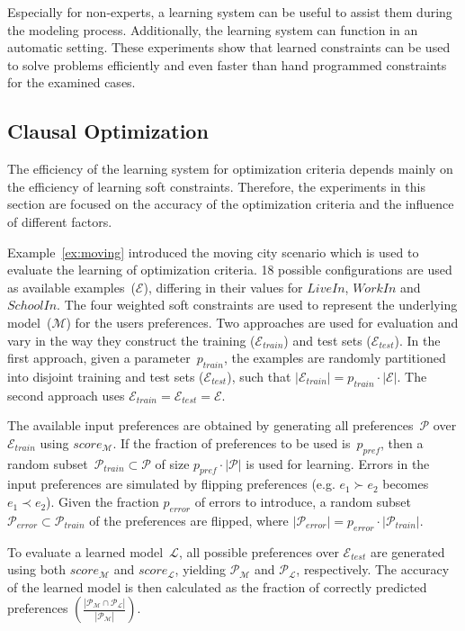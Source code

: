 \documentclass[letterpaper]{article}
\newcommand{\sym}[1]{\ensuremath{\mathcal{#1}}}
\theoremstyle{definition}
\newcommand{\abs}[1]{\left|#1\right|}
\begin{document}
Especially for non-experts, a learning system can be useful to assist them during the modeling process.
Additionally, the learning system can function in an automatic setting.
These experiments show that learned constraints can be used to solve problems efficiently and even faster than hand programmed constraints for the examined cases.

\subsection{Clausal Optimization}
The efficiency of the learning system for optimization criteria depends mainly on the efficiency of learning soft constraints.
Therefore, the experiments in this section are focused on the accuracy of the optimization criteria and the influence of different factors.

Example~\ref{ex:moving} introduced the moving city scenario which is used to evaluate the learning of optimization criteria.
18 possible configurations are used as available examples~(\sym{E}), differing in their values for $\mathit{LiveIn}$, $\mathit{WorkIn}$ and $\mathit{SchoolIn}$.
The four weighted soft constraints are used to represent the underlying model~(\sym{M}) for the users preferences.
Two approaches are used for evaluation and vary in the way they construct the training ($\sym{E}_{train}$) and test sets ($\sym{E}_{test}$).
In the first approach, given a parameter~$p_{train}$, the examples are randomly partitioned into disjoint training and test sets ($\sym{E}_{test}$), such that $\abs{\sym{E}_{train}} = p_{train} \cdot \abs{\sym{E}}$.
The second approach uses $\sym{E}_{train} = \sym{E}_{test} = \sym{E}$.

The available input preferences are obtained by generating all preferences~$\sym{P}$ over $\sym{E}_{train}$ using $score_{\sym{M}}$.
If the fraction of preferences to be used is~$p_{pref}$, then a random subset~$\sym{P}_{train} \subset \sym{P}$ of size $p_{pref} \cdot \abs{\sym{P}}$ is used for learning.
Errors in the input preferences are simulated by flipping preferences (e.g. $e_1 \succ e_2$ becomes $e_1 \prec e_2$).
Given the fraction $p_{error}$ of errors to introduce, a random subset $\sym{P}_{error} \subset \sym{P}_{train}$ of the preferences are flipped, where $\abs{\sym{P}_{error}} = p_{error} \cdot \abs{\sym{P}_{train}}$.

To evaluate a learned model~$\sym{L}$, all possible preferences over $\sym{E}_{test}$ are generated using both $score_{\sym{M}}$ and $score_{\sym{L}}$, yielding $\sym{P}_\sym{M}$ and $\sym{P}_\sym{L}$, respectively.
The accuracy of the learned model is then calculated as the fraction of correctly predicted preferences $(\frac{\abs{\sym{P}_\sym{M} \cap \sym{P}_\sym{L}}}{\abs{\sym{P}_\sym{M}}})$.
\end{document}
